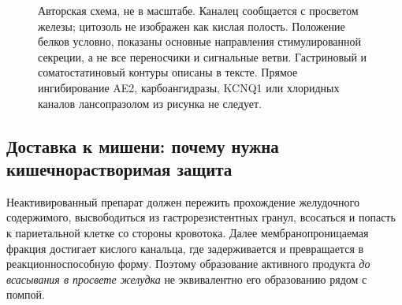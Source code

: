\documentclass[11pt,a4paper,notitlepage]{report}
\newcommand{\src}[1]{\unskip\space\cite{#1}}
\begin{document}
\begin{figure}[htbp]
\caption{Авторская схема, не в масштабе. Каналец сообщается с просветом железы; цитозоль не изображен как кислая полость. Положение белков условно, показаны основные направления стимулированной секреции, а не все переносчики и сигнальные ветви. Гастриновый и соматостатиновый контуры описаны в тексте. Прямое ингибирование AE2, карбоангидразы, KCNQ1 или хлоридных каналов лансопразолом из рисунка не следует.\src{molh2signal,molprobes,molezrin,molca,molae2,molkchannel,molslc26,molcys}}
\label{fig:parietal-mechanism}
\end{figure}

\subsection{Доставка к мишени: почему нужна кишечнорастворимая защита}
Неактивированный препарат должен пережить прохождение желудочного содержимого, высвободиться из гастрорезистентных гранул, всосаться и попасть к париетальной клетке со стороны кровотока. Далее мембранопроницаемая фракция достигает кислого канальца, где задерживается и превращается в реакционноспособную форму. Поэтому образование активного продукта \emph{до всасывания в просвете желудка} не эквивалентно его образованию рядом с помпой.\src{pharmalabel,molnagaya90}
\end{document}
